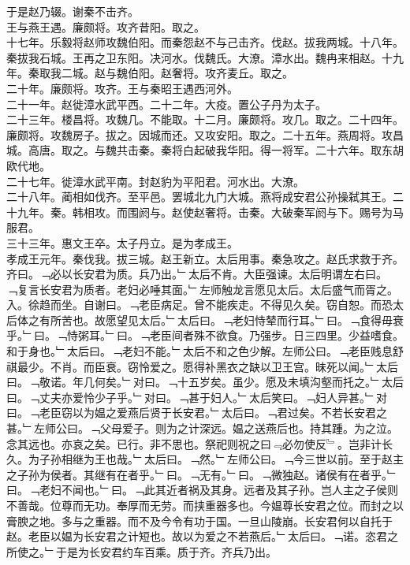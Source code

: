 \documentclass{zhvt-classic}
\begin{document}
\hspace*{2em}于是赵乃辍。谢秦不击齐。\\
\hspace*{2em}王与燕王遇。廉颇将。攻齐昔阳。取之。\\
\hspace*{2em}十七年。乐毅将赵师攻魏伯阳。而秦怨赵不与己击齐。伐赵。拔我两城。十八年。秦拔我石城。王再之卫东阳。决河水。伐魏氏。大潦。漳水出。魏冉来相赵。十九年。秦取我二城。赵与魏伯阳。赵奢将。攻齐麦丘。取之。\\
\hspace*{2em}二十年。廉颇将。攻齐。王与秦昭王遇西河外。\\
\hspace*{2em}二十一年。赵徙漳水武平西。二十二年。大疫。置公子丹为太子。\\
\hspace*{2em}二十三年。楼昌将。攻魏几。不能取。十二月。廉颇将。攻几。取之。二十四年。廉颇将。攻魏房子。拔之。因城而还。又攻安阳。取之。二十五年。燕周将。攻昌城。高唐。取之。与魏共击秦。秦将白起破我华阳。得一将军。二十六年。取东胡欧代地。\\
\hspace*{2em}二十七年。徙漳水武平南。封赵豹为平阳君。河水出。大潦。\\
\hspace*{2em}二十八年。蔺相如伐齐。至平邑。罢城北九门大城。燕将成安君公孙操弑其王。二十九年。秦。韩相攻。而围阏与。赵使赵奢将。击秦。大破秦军阏与下。赐号为马服君。\\
\hspace*{2em}三十三年。惠文王卒。太子丹立。是为孝成王。\\
\hspace*{2em}孝成王元年。秦伐我。拔三城。赵王新立。太后用事。秦急攻之。赵氏求救于齐。齐曰。﹁必以长安君为质。兵乃出。﹂太后不肯。大臣强谏。太后明谓左右曰。﹁复言长安君为质者。老妇必唾其面。﹂左师触龙言愿见太后。太后盛气而胥之。入。徐趋而坐。自谢曰。﹁老臣病足。曾不能疾走。不得见久矣。窃自恕。而恐太后体之有所苦也。故愿望见太后。﹂太后曰。﹁老妇恃辇而行耳。﹂曰。﹁食得毋衰乎。﹂曰。﹁恃粥耳。﹂曰。﹁老臣间者殊不欲食。乃强步。日三四里。少益嗜食。和于身也。﹂太后曰。﹁老妇不能。﹂太后不和之色少解。左师公曰。﹁老臣贱息舒祺最少。不肖。而臣衰。窃怜爱之。愿得补黑衣之缺以卫王宫。昧死以闻。﹂太后曰。﹁敬诺。年几何矣。﹂对曰。﹁十五岁矣。虽少。愿及未填沟壑而托之。﹂太后曰。﹁丈夫亦爱怜少子乎。﹂对曰。﹁甚于妇人。﹂太后笑曰。﹁妇人异甚。﹂对曰。﹁老臣窃以为媪之爱燕后贤于长安君。﹂太后曰。﹁君过矣。不若长安君之甚。﹂左师公曰。﹁父母爱子。则为之计深远。媪之送燕后也。持其踵。为之泣。念其远也。亦哀之矣。已行。非不思也。祭祀则祝之曰﹃必勿使反﹄。岂非计长久。为子孙相继为王也哉。﹂太后曰。﹁然。﹂左师公曰。﹁今三世以前。至于赵主之子孙为侯者。其继有在者乎。﹂曰。﹁无有。﹂曰。﹁微独赵。诸侯有在者乎。﹂曰。﹁老妇不闻也。﹂曰。﹁此其近者祸及其身。远者及其子孙。岂人主之子侯则不善哉。位尊而无功。奉厚而无劳。而挟重器多也。今媪尊长安君之位。而封之以膏腴之地。多与之重器。而不及今令有功于国。一旦山陵崩。长安君何以自托于赵。老臣以媪为长安君之计短也。故以为爱之不若燕后。﹂太后曰。﹁诺。恣君之所使之。﹂于是为长安君约车百乘。质于齐。齐兵乃出。\\
\end{document}
